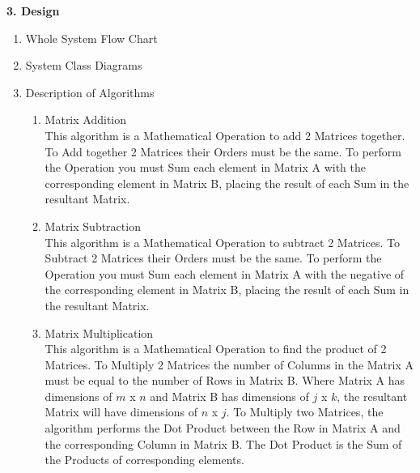\begin{flushleft}
    \huge
    \textbf{3. Design}

    \Large
    \begin{enumerate}
        \item {\Large Whole System Flow Chart}
            \large
            \vspace{0.2cm}

        \item {\Large System Class Diagrams}
            \large
            \vspace{0.2cm}

        \item {\Large Description of Algorithms}
            \large
            \vspace{0.2cm}
            \begin{enumerate}[label=\arabic*)]
                \item Matrix Addition \\
                This algorithm is a Mathematical Operation to add 2 Matrices together. To Add together 2 Matrices their Orders
                must be the same. To perform the Operation you must Sum each element in Matrix A with the corresponding element 
                in Matrix B, placing the result of each Sum in the resultant Matrix.

                \vspace{0.5cm}
                \item Matrix Subtraction \\
                This algorithm is a Mathematical Operation to subtract 2 Matrices. To Subtract 2 Matrices their Orders
                must be the same. To perform the Operation you must Sum each element in Matrix A with the negative of the 
                corresponding element in Matrix B, placing the result of each Sum in the resultant Matrix.

                \vspace{0.5cm}
                \item Matrix Multiplication \\
                This algorithm is a Mathematical Operation to find the product of 2 Matrices. To Multiply 2 Matrices
                the number of Columns in the Matrix A must be equal to the number of Rows in Matrix B. Where Matrix A has
                dimensions of $m$ x $n$ and Matrix B has dimensions of $j$ x $k$, the resultant Matrix will have dimensions of 
                $n$ x $j$. To Multiply two Matrices, the algorithm performs the Dot Product between the Row in Matrix A and the 
                corresponding Column in Matrix B. The Dot Product is the Sum of the Products of corresponding elements.


\end{enumerate}
\end{enumerate}
\end{flushleft}
